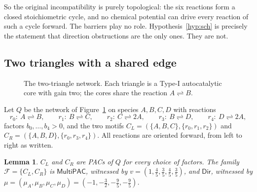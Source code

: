 \documentclass[11pt,a4paper]{article}
\theoremstyle{plain}
\newtheorem{lemma}[theorem]{Lemma}
\theoremstyle{definition}
\theoremstyle{remark}
\newcommand{\cF}{\mathcal{F}}
\newcommand{\MPAC}{\mathsf{MultiPAC}}
\newcommand{\DIR}{\mathsf{Dir}}
\newcommand{\rev}{\rightleftharpoons}
\begin{document}
So the original incompatibility is purely topological: the six reactions form a closed stoichiometric cycle, and no chemical potential can drive every reaction of such a cycle forward. The barriers play no role. Hypothesis~\ref{hyp:sch} is precisely the statement that direction obstructions are the only ones. They are not.

\subsection{Two triangles with a shared edge}

\begin{figure}[t]
\centering
{}
\caption{The two-triangle network. Each triangle is a Type-I autocatalytic core with gain two; the cores share the reaction $A\rev B$.}
\label{fig:triangles}
\end{figure}

Let $Q$ be the network of Figure~\ref{fig:triangles} on species $A,B,C,D$ with reactions
\[
 r_0:\ A\rev B,\qquad r_1:\ B\rev C,\qquad r_2:\ C\rev 2A,\qquad r_3:\ B\rev D,\qquad r_4:\ D\rev 2A,
\]
factors $b_0,\dots,b_4>0$, and the two motifs $C_L=(\{A,B,C\},\{r_0,r_1,r_2\})$ and $C_R=(\{A,B,D\},\{r_0,r_3,r_4\})$. All reactions are oriented forward, from left to right as written.

\begin{lemma}\label{lem:trianglePAC}
$C_L$ and $C_R$ are PACs of $Q$ for every choice of factors. The family $\cF=\{C_L,C_R\}$ is $\MPAC$, witnessed by $v=(1,\tfrac45,\tfrac35,\tfrac45,\tfrac35)$, and $\DIR$, witnessed by $\mu=(\mu_A,\mu_B,\mu_C,\mu_D)=(-1,-\tfrac32,-\tfrac95,-\tfrac95)$.
\end{lemma}
\end{document}
